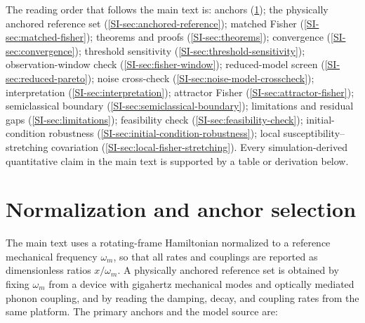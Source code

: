 \documentclass[preprint,numbers,a4paper]{elsarticle}
\begin{document}
The reading order that follows the main text is: anchors (\cref{SI-sec:anchor}); the physically anchored reference set (\cref{SI-sec:anchored-reference}); matched Fisher (\cref{SI-sec:matched-fisher}); theorems and proofs (\cref{SI-sec:theorems}); convergence (\cref{SI-sec:convergence}); threshold sensitivity (\cref{SI-sec:threshold-sensitivity}); observation-window check (\cref{SI-sec:fisher-window}); reduced-model screen (\cref{SI-sec:reduced-pareto}); noise cross-check (\cref{SI-sec:noise-model-crosscheck}); interpretation (\cref{SI-sec:interpretation}); attractor Fisher (\cref{SI-sec:attractor-fisher}); semiclassical boundary (\cref{SI-sec:semiclassical-boundary}); limitations and residual gaps (\cref{SI-sec:limitations}); feasibility check (\cref{SI-sec:feasibility-check}); initial-condition robustness (\cref{SI-sec:initial-condition-robustness}); local susceptibility--stretching covariation (\cref{SI-sec:local-fisher-stretching}). Every simulation-derived quantitative claim in the main text is supported by a table or derivation below.

\section{Normalization and anchor selection}
\label{SI-sec:anchor}

The main text uses a rotating-frame Hamiltonian normalized to a reference mechanical frequency $\omega_m$, so that all rates and couplings are reported as dimensionless ratios $x/\omega_m$. A physically anchored reference set is obtained by fixing $\omega_m$ from a device with gigahertz mechanical modes and optically mediated phonon coupling, and by reading the damping, decay, and coupling rates from the same platform. The primary anchors and the model source are:
\end{document}
